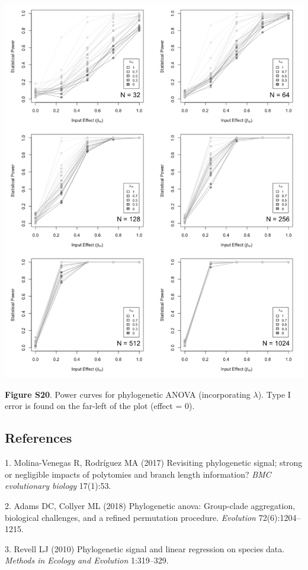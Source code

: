 \documentclass[
]{article}
\begin{document}
\includegraphics[width=0.95\linewidth]{fig.S20}

\textbf{Figure S20}. Power curves for phylogenetic ANOVA (incorporating
\(\lambda\)). Type I error is found on the far-left of the plot (effect
= 0).

\newpage

\hypertarget{references}{%
\subsection*{References}\label{references}}

\hypertarget{refs}{}
\leavevmode\hypertarget{ref-MolinaVenegas2017}{}%
1. Molina-Venegas R, Rodríguez MA (2017) Revisiting phylogenetic signal;
strong or negligible impacts of polytomies and branch length
information? \emph{BMC evolutionary biology} 17(1):53.

\leavevmode\hypertarget{ref-AdamsCollyer2018b}{}%
2. Adams DC, Collyer ML (2018) Phylogenetic anova: Group-clade
aggregation, biological challenges, and a refined permutation procedure.
\emph{Evolution} 72(6):1204--1215.

\leavevmode\hypertarget{ref-Revell2010}{}%
3. Revell LJ (2010) Phylogenetic signal and linear regression on species
data. \emph{Methods in Ecology and Evolution} 1:319--329.
\end{document}
